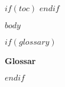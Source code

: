 \documentclass[$if(fontsize)$$fontsize$,$endif$$if(lang)$$lang$,$endif$$if(papersize)$$papersize$,$endif$$for(classoption)$$classoption$$sep$,$endfor$]{article}
\begin{document}
\newpage

\begin{titlepage}
$if(toc)$
\pagestyle{empty}
\pagecolor{$toc-color$}
\textcolor{$toc-font-color$}{\tableofcontents}
\newpage
\pagecolor{white}
$endif$
\end{titlepage}

$body$

\newpage

\begin{titlepage}
\twocolumn
$if(glossary)$
\thispagestyle{empty}
\begin{flushleft}
  \vspace*{2,5cm}\color{white}\textbf{{\Huge Glossar}} \\
\end{flushleft}
\pagecolor{$glossary-color$}
\textcolor{white}\printnoidxglossaries
$endif$
\end{titlepage}
\end{document}
